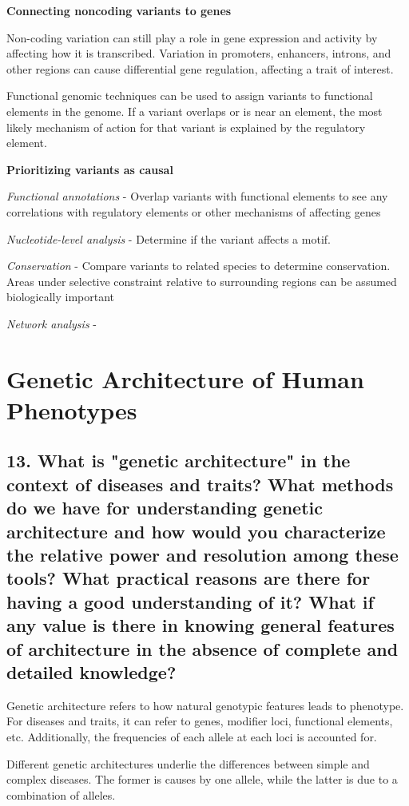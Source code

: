 \documentclass{tufte-handout}
\theoremstyle{noparens}
\begin{document}
\noindent
\textbf{Connecting noncoding variants to genes}

Non-coding variation can still play a role in gene expression and activity by affecting how it is transcribed. Variation in promoters, enhancers, introns, and other regions can cause differential gene regulation, affecting a trait of interest. 

Functional genomic techniques can be used to assign variants to functional elements in the genome. If a variant overlaps or is near an element, the most likely mechanism of action for that variant is explained by the regulatory element.

\noindent
\textbf{Prioritizing variants as causal}

\emph{Functional annotations} - Overlap variants with functional elements to see any correlations with regulatory elements or other mechanisms of affecting genes

\emph{Nucleotide-level analysis} - Determine if the variant affects a motif.

\emph{Conservation} - Compare variants to related species to determine conservation. Areas under selective constraint relative to surrounding regions can be assumed biologically important

\emph{Network analysis} - 

\newpage
\section{Genetic Architecture of Human Phenotypes}\label{sec:genarch}
\subsection{13. What is "genetic architecture" in the context of diseases and traits? What methods do we have for understanding genetic architecture and how would you characterize the relative power and resolution among these tools? What practical reasons are there for having a good understanding of it? What if any value is there in knowing general features of architecture in the absence of complete and detailed knowledge?}

Genetic architecture refers to how natural genotypic features leads to phenotype. For diseases and traits, it can refer to genes, modifier loci, functional elements, etc. Additionally, the frequencies of each allele at each loci is accounted for.

Different genetic architectures underlie the differences between simple and complex diseases. The former is causes by one allele, while the latter is due to a combination of alleles.
\end{document}

